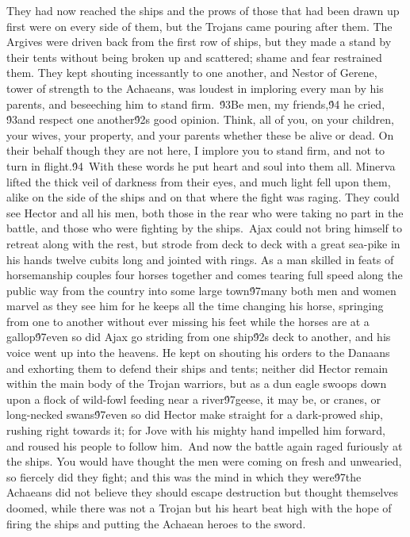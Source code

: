 {They had now reached the ships and the prows of those that had been drawn up first were on every side of them, but the Trojans came pouring after them. The Argives were driven back from the first row of ships, but they made a stand by their tents without being broken up and scattered; shame and fear restrained them. They kept shouting incessantly to one another, and Nestor of Gerene, tower of strength to the Achaeans, was loudest in imploring every man by his parents, and beseeching him to stand firm.\
\'93Be men, my friends,\'94 he cried, \'93and respect one another\'92s good opinion. Think, all of you, on your children, your wives, your property, and your parents whether these be alive or dead. On their behalf though they are not here, I implore you to stand firm, and not to turn in flight.\'94\
With these words he put heart and soul into them all. Minerva lifted the thick veil of darkness from their eyes, and much light fell upon them, alike on the side of the ships and on that where the fight was raging. They could see Hector and all his men, both those in the rear who were taking no part in the battle, and those who were fighting by the ships.\
Ajax could not bring himself to retreat along with the rest, but strode from deck to deck with a great sea-pike in his hands twelve cubits long and jointed with rings. As a man skilled in feats of horsemanship couples four horses together and comes tearing full speed along the public way from the country into some large town\'97many both men and women marvel as they see him for he keeps all the time changing his horse, springing from one to another without ever missing his feet while the horses are at a gallop\'97even so did Ajax go striding from one ship\'92s deck to another, and his voice went up into the heavens. He kept on shouting his orders to the Danaans and exhorting them to defend their ships and tents; neither did Hector remain within the main body of the Trojan warriors, but as a dun eagle swoops down upon a flock of wild-fowl feeding near a river\'97geese, it may be, or cranes, or long-necked swans\'97even so did Hector make straight for a dark-prowed ship, rushing right towards it; for Jove with his mighty hand impelled him forward, and roused his people to follow him.\
And now the battle again raged furiously at the ships. You would have thought the men were coming on fresh and unwearied, so fiercely did they fight; and this was the mind in which they were\'97the Achaeans did not believe they should escape destruction but thought themselves doomed, while there was not a Trojan but his heart beat high with the hope of firing the ships and putting the Achaean heroes to the sword.\
}
